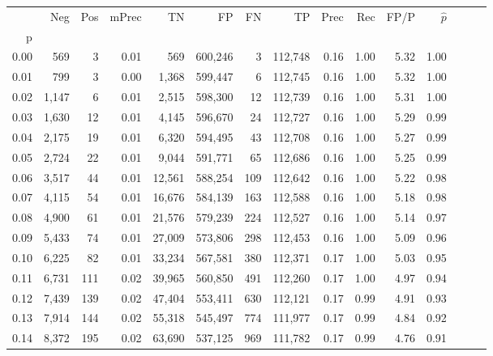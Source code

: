 \begin{tabular}{rrrrrrrrrrrrrrr}
\toprule
{} &     Neg &    Pos & mPrec &       TN &       FP &       FN &       TP &  Prec &   Rec &  FP/P & $\hat{p}$ \\
p    &         &        &       &          &          &          &          &       &       &       &           \\
\midrule
0.00 &     569 &      3 &  0.01 &      569 &  600,246 &        3 &  112,748 &  0.16 &  1.00 &  5.32 &      1.00 \\
0.01 &     799 &      3 &  0.00 &    1,368 &  599,447 &        6 &  112,745 &  0.16 &  1.00 &  5.32 &      1.00 \\
0.02 &   1,147 &      6 &  0.01 &    2,515 &  598,300 &       12 &  112,739 &  0.16 &  1.00 &  5.31 &      1.00 \\
0.03 &   1,630 &     12 &  0.01 &    4,145 &  596,670 &       24 &  112,727 &  0.16 &  1.00 &  5.29 &      0.99 \\
0.04 &   2,175 &     19 &  0.01 &    6,320 &  594,495 &       43 &  112,708 &  0.16 &  1.00 &  5.27 &      0.99 \\
0.05 &   2,724 &     22 &  0.01 &    9,044 &  591,771 &       65 &  112,686 &  0.16 &  1.00 &  5.25 &      0.99 \\
0.06 &   3,517 &     44 &  0.01 &   12,561 &  588,254 &      109 &  112,642 &  0.16 &  1.00 &  5.22 &      0.98 \\
0.07 &   4,115 &     54 &  0.01 &   16,676 &  584,139 &      163 &  112,588 &  0.16 &  1.00 &  5.18 &      0.98 \\
0.08 &   4,900 &     61 &  0.01 &   21,576 &  579,239 &      224 &  112,527 &  0.16 &  1.00 &  5.14 &      0.97 \\
0.09 &   5,433 &     74 &  0.01 &   27,009 &  573,806 &      298 &  112,453 &  0.16 &  1.00 &  5.09 &      0.96 \\
0.10 &   6,225 &     82 &  0.01 &   33,234 &  567,581 &      380 &  112,371 &  0.17 &  1.00 &  5.03 &      0.95 \\
0.11 &   6,731 &    111 &  0.02 &   39,965 &  560,850 &      491 &  112,260 &  0.17 &  1.00 &  4.97 &      0.94 \\
0.12 &   7,439 &    139 &  0.02 &   47,404 &  553,411 &      630 &  112,121 &  0.17 &  0.99 &  4.91 &      0.93 \\
0.13 &   7,914 &    144 &  0.02 &   55,318 &  545,497 &      774 &  111,977 &  0.17 &  0.99 &  4.84 &      0.92 \\
0.14 &   8,372 &    195 &  0.02 &   63,690 &  537,125 &      969 &  111,782 &  0.17 &  0.99 &  4.76 &      0.91 \\

\end{tabular}
